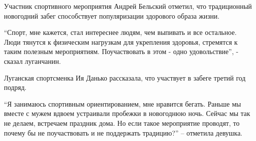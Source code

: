 
Участник спортивного мероприятия Андрей Бельский отметил, что традиционный
новогодний забег способствует популяризации здорового образа жизни.

\enquote{Спорт, мне кажется, стал интереснее людям, чем выпивать и все остальное. Люди
тянутся к физическим нагрузкам для укрепления здоровья, стремятся к таким
полезным мероприятиям. Поучаствовать в этом - одно удовольствие}, - сказал
луганчанин.

Луганская спортсменка Ия Данько рассказала, что участвует в забеге третий год
подряд.

\enquote{Я занимаюсь спортивным ориентированием, мне нравится бегать. Раньше мы вместе
с мужем вдвоем устраивали пробежки в новогоднюю ночь. Сейчас мы так не делаем,
встречаем праздник дома. Но если такое мероприятие проводят, то почему бы не
поучаствовать и не поддержать традицию?} – отметила девушка.
